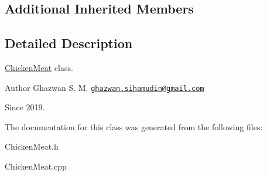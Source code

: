 \subsection*{Additional Inherited Members}


\subsection{Detailed Description}
\hyperlink{classChickenMeat}{Chicken\+Meat} class.

\begin{DoxyAuthor}{Author}
Ghazwan S. M. \href{mailto:ghazwan.sihamudin@gmail.com}{\tt ghazwan.\+sihamudin@gmail.\+com} 
\end{DoxyAuthor}
\begin{DoxySince}{Since}
2019.. 
\end{DoxySince}


The documentation for this class was generated from the following files\+:\begin{DoxyCompactItemize}
\item 
Chicken\+Meat.\+h\item 
Chicken\+Meat.\+cpp\end{DoxyCompactItemize}
